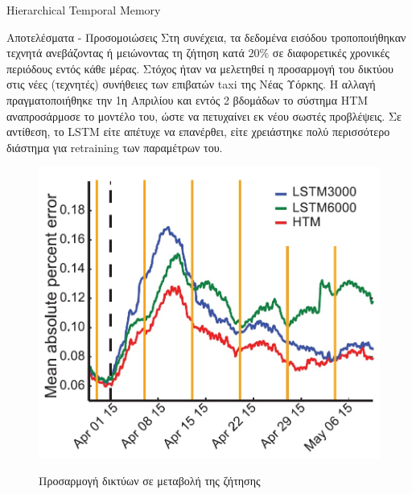 \documentclass[a4paper,11pt]{article}
\begin{document}
\begin{section}{Hierarchical Temporal Memory}
\begin{subsection}{Αποτελέσματα - Προσομοιώσεις}
    Στη συνέχεια, τα δεδομένα εισόδου τροποποιήθηκαν τεχνητά ανεβάζοντας ή μειώνοντας τη ζήτηση κατά $20\%$ σε διαφορετικές χρονικές περιόδους εντός κάθε μέρας. Στόχος ήταν να μελετηθεί η προσαρμογή του δικτύου στις νέες (τεχνητές) συνήθειες των επιβατών taxi της Νέας Υόρκης. Η αλλαγή πραγματοποιήθηκε την 1η Απριλίου και εντός 2 βδομάδων το σύστημα HTM αναπροσάρμοσε το μοντέλο του, ώστε να πετυχαίνει εκ νέου σωστές προβλέψεις. Σε αντίθεση, το LSTM είτε απέτυχε να επανέρθει, είτε χρειάστηκε πολύ περισσότερο διάστημα για retraining των παραμέτρων του.
    \begin{figure}[h]
      \centering%
      {\includegraphics[width=0.4\columnwidth,clip=true]{pics/taxi_adaptation.jpg}}
      \caption{Προσαρμογή δικτύων σε μεταβολή της ζήτησης} \label{fig:taxi-adaptation}
    \end{figure}

  \end{subsection}
\end{section}
\end{document}
